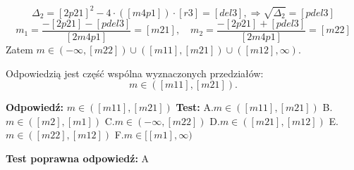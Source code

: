 \documentclass[12pt, a4paper]{article}
\theoremstyle{definition} %
\theoremstyle{definition} %
\newcommand{\rozwStop}{\newline}                                            %
\newcommand{\odpStart}{\noindent \textbf{Odpowiedź:}\newline}    %
\newcommand{\odpStop}{\newline}                                             %
\newcommand{\testStart}{\noindent \textbf{Test:}\newline} %
\newcommand{\testStop}{\newline} %
\newcommand{\kluczStart}{\noindent \textbf{Test poprawna odpowiedź:}\newline} %
\newcommand{\kluczStop}{\newline} %
\begin{document}
$$\Delta_{2}=[2p21]^{2}-4\cdot([m4p1])\cdot[r3]=[del3], \Rightarrow \sqrt{\Delta_{2}}=[pdel3]$$
$$m_{1}=\frac{-[2p21]-[pdel3]}{[2m4p1]}=[m21], \quad m_{2}=\frac{-[2p21]+[pdel3]}{[2m4p1]}=[m22]$$
Zatem $m\in(-\infty,[m22])\cup([m11],[m21])\cup([m12],\infty).$

Odpowiedzią jest część wspólna wyznaczonych przedziałów:
$$m\in([m11],[m21]).$$
\rozwStop


\odpStart
$m\in([m11],[m21])$
\odpStop
\testStart
A.$m\in([m11],[m21])$
B.$m\in([m2],[m1])$
C.$m\in(-\infty,[m22])$
D.$m\in([m21],[m12])$
E.$m\in([m22],[m12])$
F.$m\in[[m1],\infty)$


\testStop
\kluczStart
A
\kluczStop
\end{document}
